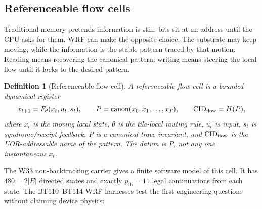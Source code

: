 \documentclass[11pt,letterpaper]{article}
\newtheorem{definition}[theorem]{Definition}
\theoremstyle{remark}
\begin{document}
\subsection{Referenceable flow cells}

\begin{plainenglish}
Traditional memory pretends information is still: bits sit at an address until the CPU
asks for them. WRF can make the opposite choice. The substrate may keep moving, while the
information is the stable pattern traced by that motion. Reading means recovering the
canonical pattern; writing means steering the local flow until it locks to the desired
pattern.
\end{plainenglish}

\begin{definition}[Referenceable flow cell]
A referenceable flow cell is a bounded dynamical register
\[
x_{t+1}=F_\theta(x_t,u_t,s_t),\qquad
P=\mathrm{canon}(x_0,x_1,\ldots,x_T),\qquad
\mathrm{CID}_{\rm flow}=H(P),
\]
where $x_t$ is the moving local state, $\theta$ is the tile-local routing rule, $u_t$ is
input, $s_t$ is syndrome/receipt feedback, $P$ is a canonical trace invariant, and
$\mathrm{CID}_{\rm flow}$ is the UOR-addressable name of the pattern. The datum is
$P$, not any one instantaneous $x_t$.
\end{definition}

The W33 non-backtracking carrier gives a finite software model of this cell. It has
$480=2|E|$ directed states and exactly $p_{\mathrm{Ih}}=11$ legal continuations from each
state. The BT110--BT114 WRF harnesses \cite{wrf-bt110-bt111,wrf-bt112,wrf-bt113,wrf-bt114} test the first
engineering questions without claiming device physics:
\end{document}
